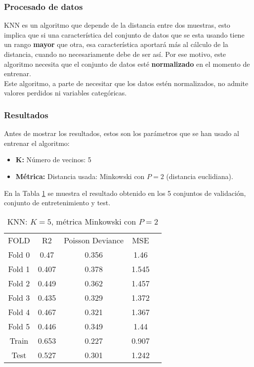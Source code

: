 \subsubsection*{Procesado de datos}
KNN es un algoritmo que depende de la distancia entre dos muestras, esto implica que si una característica del conjunto de datos que se esta usando tiene un rango \textbf{mayor} que otra, esa característica aportará más al cálculo de la distancia, cuando no necesariamente debe de ser así. Por ese motivo, este algoritmo necesita que el conjunto de datos esté \textbf{normalizado} en el momento de entrenar.\\
\linebreak
Este algoritmo, a parte de necesitar que los datos estén normalizados, no admite valores perdidos ni variables categóricas.
\subsubsection*{Resultados}
Antes de mostrar los resultados, estos son los parámetros que se han usado al entrenar el algoritmo:
\begin{itemize}
	\item \textbf{K:} Número de vecinos: 5
	\item \textbf{Métrica:} Distancia usada: Minkowski con $P=2$ (distancia euclidiana).
\end{itemize}
En la Tabla \ref{tab:knn_res} se muestra el resultado obtenido en los 5 conjuntos de validación, conjunto de entretenimiento y test.
\begin{table}[H]
	\centering
	\begin{tabular}{|c|c|c|c|c}
		\cline{1-4}
		FOLD   & R2    & Poisson Deviance & MSE   \\ \cline{1-4}
		Fold 0 & 0.47  & 0.356            & 1.46  \\  \cline{1-4}
		Fold 1 & 0.407 & 0.378            & 1.545 \\  \cline{1-4}
		Fold 2 & 0.449 & 0.362            & 1.457 \\  \cline{1-4}
		Fold 3 & 0.435 & 0.329            & 1.372 \\  \cline{1-4}
		Fold 4 & 0.467 & 0.321            & 1.367 \\  \cline{1-4}
		Fold 5 & 0.446 & 0.349            & 1.44  \\  \cline{1-4}
		Train  & 0.653 & 0.227            & 0.907 \\ \cline{1-4}
		Test   & 0.527 & 0.301            & 1.242 \\ \cline{1-4}
	\end{tabular}
	\caption{KNN: $K=5$, métrica Minkowski con $P=2$}
	\label{tab:knn_res}
\end{table}
